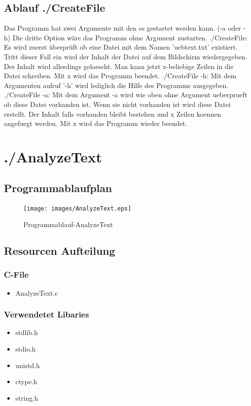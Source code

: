 \documentclass{scrartcl}
\begin{document}
\subsection{Ablauf ./CreateFile}
Das Programm hat zwei Argumente mit den es gestartet werden kann. (-a oder -h) Die dritte Option wäre das Programm ohne Argument zustarten.
./CreateFile:
Es wird zuerst überprüft ob eine Datei mit dem Namen 'uebtext.txt' existiert. Tritt dieser Fall ein wird der Inhalt der Datei auf dem Bildschirm wiedergegeben. Der Inhalt wird allerdings geloescht. Man kann jetzt x-beliebige Zeilen in die Datei schreiben. Mit x wird das Programm beendet.
./CreateFile -h:
Mit dem Argumenten aufruf '-h' wird lediglich die Hilfe des Programms ausgegeben.
./CreateFile -a:
Mit dem Argument -a wird wie oben ohne Argument ueberprueft ob diese Datei vorhanden ist. Wenn sie nicht vorhanden ist wird diese Datei erstellt. Der Inhalt falls vorhanden bleibt bestehen und x Zeilen koennen angefuegt werden. Mit x wird das Programm wieder beendet.
\section{./AnalyzeText}
\subsection{Programmablaufplan}
\begin{figure}[H]
  \centering
  \texttt{[image: images/AnalyzeText.eps]}
  \caption{Programmablauf-AnalyzeText}
  \label{fig:digraph}
\end{figure}
\subsection{Resourcen Aufteilung}
\subsubsection{C-File}
\begin{itemize}
\item AnalyzeText.c
\end{itemize}
\subsubsection{Verwendetet Libaries}
\begin{itemize}
\item stdlib.h
\item stdio.h
\item unistd.h
\item ctype.h
\item string.h
\end{itemize}
\end{document}
